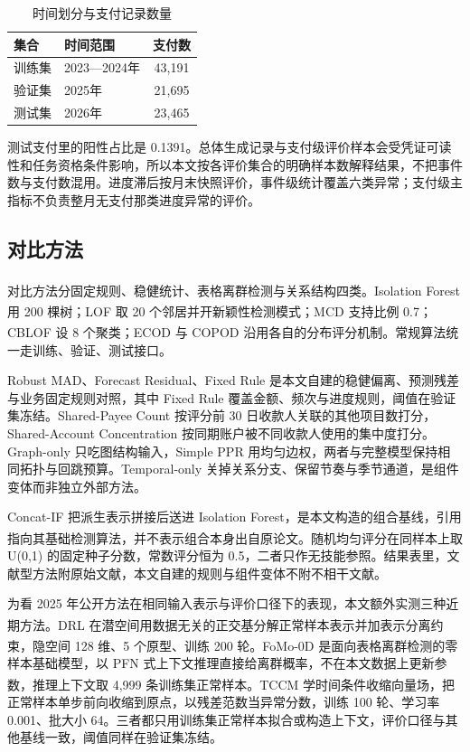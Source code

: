 \documentclass[a4paper,fleqn]{cas-dc}
\newcommand{\upcite}[1]{\textsuperscript{\cite{#1}}}
\begin{document}
\begin{table}[pos=tbp]
\scriptsize
\setlength{\tabcolsep}{3pt}
\caption{时间划分与支付记录数量}
\begin{tabular*}{\tblwidth}{@{\extracolsep{\fill}}llc@{}}
\toprule
集合 & 时间范围 & 支付数 \\
\midrule
训练集 & 2023—2024年 & 43,191 \\
验证集 & 2025年 & 21,695 \\
测试集 & 2026年 & 23,465 \\
\bottomrule
\end{tabular*}
\end{table}

测试支付里的阳性占比是 0.1391。总体生成记录与支付级评价样本会受凭证可读性和任务资格条件影响，所以本文按各评价集合的明确样本数解释结果，不把事件数与支付数混用。进度滞后按月末快照评价，事件级统计覆盖六类异常；支付级主指标不负责整月无支付那类进度异常的评价。

\subsection{对比方法}
对比方法分固定规则、稳健统计、表格离群检测与关系结构四类。Isolation Forest\upcite{ref2} 用 200 棵树；LOF\upcite{ref3} 取 20 个邻居并开新颖性检测模式；MCD\upcite{ref4} 支持比例 0.7；CBLOF\upcite{ref5} 设 8 个聚类；ECOD\upcite{ref13} 与 COPOD\upcite{ref14} 沿用各自的分布评分机制。常规算法统一走训练、验证、测试接口。

Robust MAD、Forecast Residual、Fixed Rule 是本文自建的稳健偏离、预测残差与业务固定规则对照，其中 Fixed Rule 覆盖金额、频次与进度规则，阈值在验证集冻结。Shared-Payee Count 按评分前 30 日收款人关联的其他项目数打分，Shared-Account Concentration 按同期账户被不同收款人使用的集中度打分。Graph-only 只吃图结构输入，Simple PPR 用均匀边权，两者与完整模型保持相同拓扑与回跳预算。Temporal-only 关掉关系分支、保留节奏与季节通道，是组件变体而非独立外部方法。

Concat-IF 把派生表示拼接后送进 Isolation Forest，是本文构造的组合基线，引用指向其基础检测算法\upcite{ref2}，并不表示组合本身出自原论文。随机均匀评分在同样本上取 U(0,1) 的固定种子分数，常数评分恒为 0.5，二者只作无技能参照。结果表里，文献型方法附原始文献，本文自建的规则与组件变体不附不相干文献。

为看 2025 年公开方法在相同输入表示与评价口径下的表现，本文额外实测三种近期方法。DRL\upcite{ref38} 在潜空间用数据无关的正交基分解正常样本表示并加表示分离约束，隐空间 128 维、5 个原型、训练 200 轮。FoMo-0D\upcite{ref39} 是面向表格离群检测的零样本基础模型，以 PFN 式上下文推理直接给离群概率，不在本文数据上更新参数，推理上下文取 4,999 条训练集正常样本。TCCM\upcite{ref40} 学时间条件收缩向量场，把正常样本单步前向收缩到原点，以残差范数当异常分数，训练 100 轮、学习率 0.001、批大小 64。三者都只用训练集正常样本拟合或构造上下文，评价口径与其他基线一致，阈值同样在验证集冻结。
\end{document}
